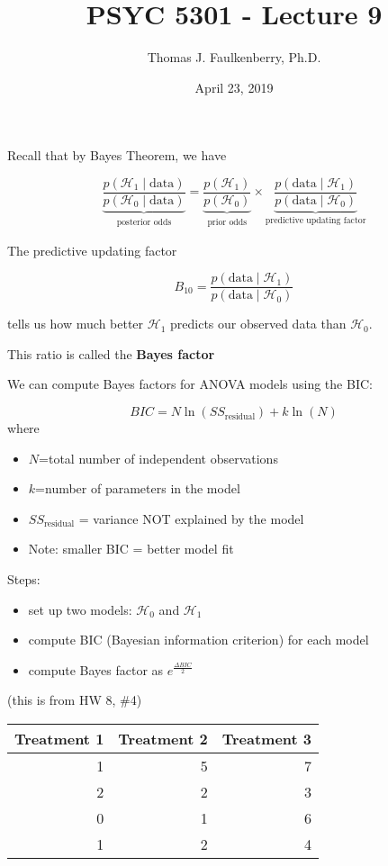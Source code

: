 \documentclass[portrait,footrule,17pt]{foils}
\author{Thomas J. Faulkenberry, Ph.D.}
\date{April 23, 2019}
\title{PSYC 5301 - Lecture 9}
\begin{document}
\maketitle

\label{sec:org31b3b66}

Recall that by Bayes Theorem, we have

\[
\underbrace{\frac{p(\mathcal{H}_1\mid \text{data})}{p(\mathcal{H}_0\mid \text{data})}}_{\substack{\text{posterior odds}}} = \underbrace{\frac{p(\mathcal{H}_1)}{p(\mathcal{H}_0)}}_{\substack{\text{prior odds}}} \times \underbrace{\frac{p(\text{data}\mid \mathcal{H}_1)}{p(\text{data}\mid \mathcal{H}_0)}}_{\text{predictive updating factor}}
\]

The predictive updating factor

\[
B_{10} = \frac{p(\text{data}\mid \mathcal{H}_1)}{p(\text{data}\mid \mathcal{H}_0)}
\]

tells us how much better \(\mathcal{H}_1\) predicts our observed data than \(\mathcal{H}_0\).

This ratio is called the \textbf{Bayes factor}

\foilhead[-1cm]{}
\label{sec:orgaedbdda}

We can compute Bayes factors for ANOVA models using the BIC:

\[
BIC = N\ln (SS_{\text{residual}}) + k\ln(N)
\]
where
\begin{itemize}
\item \(N\)=total number of independent observations
\item \(k\)=number of parameters in the model
\item \(SS_{\text{residual}}\) = variance NOT explained by the model
\item Note: smaller BIC = better model fit
\end{itemize}

Steps:
\begin{itemize}
\item set up two models: \(\mathcal{H}_0\) and \(\mathcal{H}_1\)
\item compute BIC (Bayesian information criterion) for each model
\item compute Bayes factor as \(\displaystyle{e^{\frac{\Delta BIC}{2}}}\)
\end{itemize}

\label{sec:org2cc5feb}
(this is from HW 8, \#4)

\begin{center}
\begin{tabular}{rrr}
Treatment 1 & Treatment 2 & Treatment 3\\
\hline
1 & 5 & 7\\
2 & 2 & 3\\
0 & 1 & 6\\
1 & 2 & 4\\
\end{tabular}
\end{center}
\end{document}
